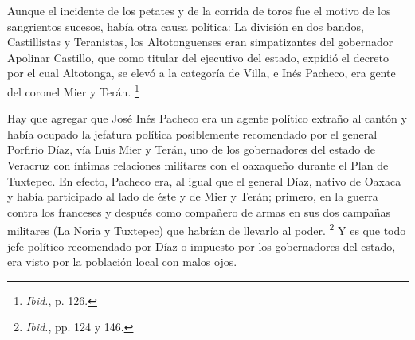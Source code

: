 \documentclass[14pt,twoside,final]{extbook} %
\let\oldfootnote\footnote
\renewcommand\footnote[1]{%
\oldfootnote{\hspace{1mm}#1}}
\begin{document}
\begin{quoting}
Aunque el incidente de los petates y de la corrida de toros fue el motivo de los sangrientos sucesos, había otra causa política: La división en dos bandos, Castillistas y Teranistas, los Altotonguenses eran simpatizantes del gobernador Apolinar Castillo, que como titular del ejecutivo del estado, expidió el decreto por el cual Altotonga, se elevó a la categoría de Villa, e Inés Pacheco, era gente del coronel Mier y Terán.\footnote{\emph{Ibid.}, p. 126.}
\end{quoting}
Hay que agregar que José Inés Pacheco era un agente político extraño al cantón y había ocupado la jefatura política posiblemente recomendado por el general Porfirio Díaz, vía Luis Mier y Terán, uno de los gobernadores del estado de Veracruz con íntimas relaciones militares con el oaxaqueño durante el Plan de Tuxtepec. En efecto, Pacheco era, al igual que el general Díaz, nativo de Oaxaca y había participado al lado de éste y de Mier y Terán; primero, en la guerra contra los franceses y después como compañero de armas en sus dos campañas militares (La Noria y Tuxtepec) que habrían de llevarlo al poder.\footnote{\emph{Ibid.}, pp. 124 y 146.} Y es que todo jefe político recomendado por Díaz o impuesto por los gobernadores del estado, era visto por la población local con malos ojos.
\end{document}
